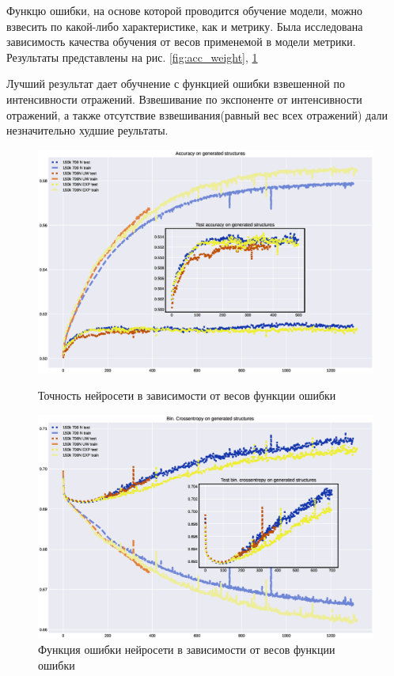 \documentclass{article}
\begin{document}
Функцю ошибки, на основе которой проводится обучение модели, можно взвесить по какой-либо характеристике, как и метрику. Была исследована зависимость качества обучения от весов применемой в модели метрики. Результаты представлены на рис. \ref{fig:acc_weight}, \ref{fig:loss_weight}

Лучший результат дает обучнение с функцией ошибки взвешенной по интенсивности отражений. Взвешивание по экспоненте от интенсивности отражений, а также отсутствие взвешивания(равный вес всех отражений) дали незначительно худшие реультаты. 

\begin{figure}[!h]
\includegraphics[width=\linewidth]{imgs/acc-weight.eps}
  \caption{Точность нейросети в зависимости от весов функции ошибки}\label{fig:acc_weight}
\endminipage\hfill
{}%
\includegraphics[width=\linewidth]{imgs/loss-weight.eps}
  \caption{Функция ошибки нейросети в зависимости от весов функции ошибки}\label{fig:loss_weight}
\endminipage
\end{figure}
\end{document}
